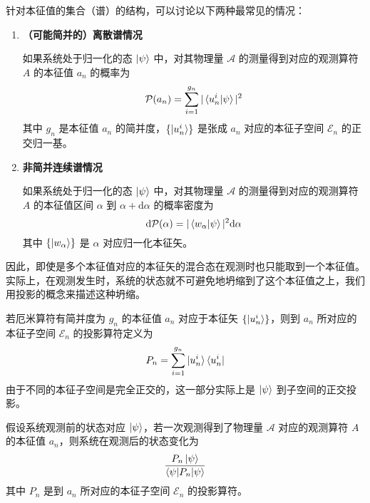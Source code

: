 \documentclass[cn,10pt,math=newtx,citestyle=gb7714-2015,bibstyle=gb7714-2015]{elegantbook}
\def\bf{\textbf}
\def\ms{\mathscr}
\def\mc{\mathcal}
\def\d{\mathrm d}
\def\P{\mathcal P}
\begin{document}
\begin{postulate}[得到观测值的概率]\label{pos:measurablepr} 
   针对本征值的集合（谱）的结构，可以讨论以下两种最常见的情况：
   \begin{enumerate}
      \item \bf{（可能简并的）离散谱情况}
      
      如果系统处于归一化的态 $\ket{\psi}$ 中，对其物理量 $\mc A$ 的测量得到对应的观测算符 $A$ 的本征值 $a_n$ 的概率为
      \begin{equation}
         \P(a_n) = \sum_{i=1}^{g_n}|\braket{u_n^i|\psi}|^2
      \end{equation}
      其中 $g_n$ 是本征值 $a_n$ 的简并度，$\{\ket{u_n^i}\}$ 是张成 $a_n$ 对应的本征子空间 $\ms E_n$ 的正交归一基。

      \item \bf{非简并连续谱情况}
      
      如果系统处于归一化的态 $\ket{\psi}$ 中，对其物理量 $\mc A$ 的测量得到对应的观测算符 $A$ 的本征值区间 $\alpha$ 到 $\alpha+\d\alpha$ 的概率密度为
      \begin{equation}
         \d\P(\alpha) = |\braket{w_\alpha|\psi}|^2\d\alpha
      \end{equation}
      其中 $\{\ket{w_\alpha}\}$ 是 $\alpha$ 对应归一化本征矢。
      
   \end{enumerate}
   
\end{postulate}

因此，即使是多个本征值对应的本征矢的混合态在观测时也只能取到一个本征值。实际上，在观测发生时，系统的状态就不可避免地坍缩到了这个本征值之上，我们用投影的概念来描述这种坍缩。

\begin{definition}[投影算符]\label{def:project}
   若厄米算符有简并度为 $g_n$ 的本征值 $a_n$ 对应于本征矢 $\{\ket{u_n^i}\}$，则到 $a_n$ 所对应的本征子空间 $\ms E_n$ 的投影算符定义为
   \begin{equation}
    P_n=\sum_{i=1}^{g_n}\ket{u_n^i}\bra{u_n^i}
\end{equation}
由于不同的本征子空间是完全正交的，这一部分实际上是 $\ket{\psi}$ 到子空间的正交投影。
\end{definition}

\begin{postulate}[观测对系统的影响]\label{pos:measurablestate} 
   假设系统观测前的状态对应 $\ket{\psi}$，若一次观测得到了物理量 $\mc A$ 对应的观测算符 $A$ 的本征值 $a_n$，则系统在观测后的状态变化为
   \begin{equation*}
         \frac{P_n\ket{\psi}}{\braket{\psi|P_n|\psi}}
      \end{equation*}
   其中 $P_n$ 是到 $a_n$ 所对应的本征子空间 $\ms E_n$ 的投影算符。
\end{postulate}
\end{document}
